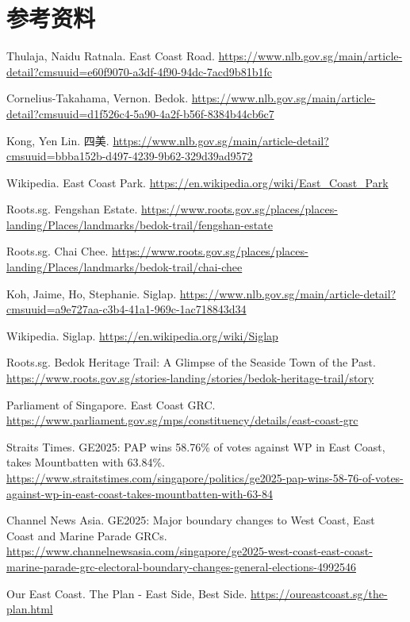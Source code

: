 \documentclass[11pt,a4paper,twoside,openany]{book}
\begin{document}
\section*{参考资料}
\begin{enumerate}[label={[\arabic*]},leftmargin=*,topsep=2pt,itemsep=1pt,parsep=0pt]
  \item Thulaja, Naidu Ratnala. East Coast Road. \url{https://www.nlb.gov.sg/main/article-detail?cmsuuid=e60f9070-a3df-4f90-94dc-7acd9b81b1fc}
  \item Cornelius-Takahama, Vernon. Bedok. \url{https://www.nlb.gov.sg/main/article-detail?cmsuuid=d1f526c4-5a90-4a2f-b56f-8384b44cb6c7}
  \item Kong, Yen Lin. 四美. \url{https://www.nlb.gov.sg/main/article-detail?cmsuuid=bbba152b-d497-4239-9b62-329d39ad9572}
  \item Wikipedia. East Coast Park. \url{https://en.wikipedia.org/wiki/East_Coast_Park}
  \item Roots.sg. Fengshan Estate. \url{https://www.roots.gov.sg/places/places-landing/Places/landmarks/bedok-trail/fengshan-estate}
  \item Roots.sg. Chai Chee. \url{https://www.roots.gov.sg/places/places-landing/Places/landmarks/bedok-trail/chai-chee}
  \item Koh, Jaime, Ho, Stephanie. Siglap. \url{https://www.nlb.gov.sg/main/article-detail?cmsuuid=a9e727aa-c3b4-41a1-969c-1ac718843d34}
  \item Wikipedia. Siglap. \url{https://en.wikipedia.org/wiki/Siglap}
  \item Roots.sg. Bedok Heritage Trail: A Glimpse of the Seaside Town of the Past. \url{https://www.roots.gov.sg/stories-landing/stories/bedok-heritage-trail/story}
  \item Parliament of Singapore. East Coast GRC. \url{https://www.parliament.gov.sg/mps/constituency/details/east-coast-grc}
  \item Straits Times. GE2025: PAP wins 58.76\% of votes against WP in East Coast, takes Mountbatten with 63.84\%. \url{https://www.straitstimes.com/singapore/politics/ge2025-pap-wins-58-76-of-votes-against-wp-in-east-coast-takes-mountbatten-with-63-84}
  \item Channel News Asia. GE2025: Major boundary changes to West Coast, East Coast and Marine Parade GRCs. \url{https://www.channelnewsasia.com/singapore/ge2025-west-coast-east-coast-marine-parade-grc-electoral-boundary-changes-general-elections-4992546}
  \item Our East Coast. The Plan - East Side, Best Side. \url{https://oureastcoast.sg/the-plan.html}
\end{enumerate}
\end{document}
